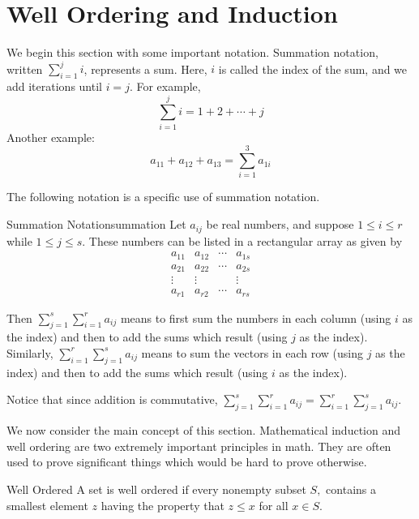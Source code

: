 \section{Well Ordering and Induction}

\label{wellorderingsection}

We begin this section with some important notation. Summation notation, written $\sum_{i=1}^{j} i $, represents a sum. Here, $i$ is called the index of the sum, and we add iterations until $i=j$. For example, 
\[
\sum_{i=1}^{j} i = 1 + 2 + \cdots + j 
\]
Another example: 
\[
a_{11} + a_{12} + a_{13}  = \sum_{i=1}^{3} a_{1i}
\]

The following notation is a specific use of summation notation. 

\begin{notation}{Summation Notation}{summation}
Let $a_{ij}$ be real numbers, and suppose  $1\leq i\leq r$ while $
1\leq j\leq s$. These numbers can be listed in a rectangular array as given by 
\begin{equation*}
\begin{array}{cccc}
a_{11} & a_{12} & \cdots & a_{1s} \\ 
a_{21} & a_{22} & \cdots & a_{2s} \\ 
\vdots & \vdots &  & \vdots \\ 
a_{r1} & a_{r2} & \cdots & a_{rs}
\end{array}
\end{equation*}

Then $\sum_{j=1}^{s}\sum_{i=1}^{r} a_{ij}$ means to first sum the numbers
in each column (using $i$ as the index) and then to add the sums which result (using $j$ as the index). Similarly,  
$\sum_{i=1}^{r}\sum_{j=1}^{s} a_{ij}$ means to sum the vectors in
each row (using $j$ as the index) and then to add the sums which result (using $i$ as the index). 
\end{notation}

Notice that since addition is commutative, $\sum_{j=1}^{s}\sum_{i=1}^{r} a_{ij} = \sum_{i=1}^{r}\sum_{j=1}^{s} a_{ij}$. 

We now consider the main concept of this section. Mathematical induction and well ordering are two extremely important
principles in math. They are often used to prove significant things which
would be hard to prove otherwise.

\begin{definition}{Well Ordered}\label{def:wellordered}
 A set is well ordered if every nonempty subset $S,$ contains a
smallest element $z$ having the property that $z\leq x$ for all $x\in S.$
\end{definition}

